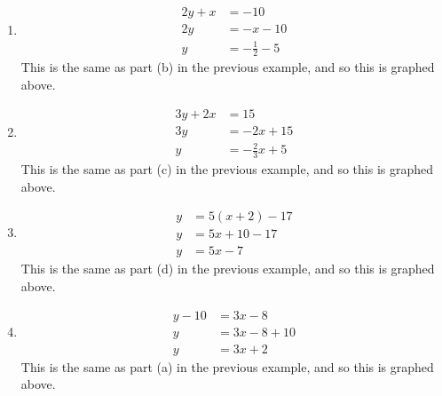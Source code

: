 \documentclass[oneside]{book}
\theoremstyle{definition}
\theoremstyle{solution}
\newtheorem*{solution}{Solution}
\newenvironment{solution}{\vspace{2in}\comment}{\endcomment}
\begin{document}
\begin{solution}
\begin{enumerate}
\item \begin{align*}
 2y + x & = -10\\
 2y & = -x -10\\
 y & = -\frac{1}{2} -5
\end{align*}
This is the same as part (b) in the previous example, and so this is
graphed above.  

\item 
\begin{align*}
3y + 2x & = 15\\
3y & = -2x + 15\\
 y & = -\frac 23 x +5
\end{align*}
This is the same as part (c) in the previous example, and so this is
graphed above.  


\item 
\begin{align*}
y &= 5(x+2)-17\\
y & = 5x + 10 - 17\\
y & = 5x - 7
\end{align*}
This is the same as part (d) in the previous example, and so this is
graphed above.


\item 
\begin{align*}
y - 10 & = 3x-8 \\
y & = 3x -8 +10\\
y & = 3x +2
\end{align*}
This is the same as part (a) in the previous example, and so this is
graphed above.  
\end{enumerate}
\end{solution}
\end{document}
